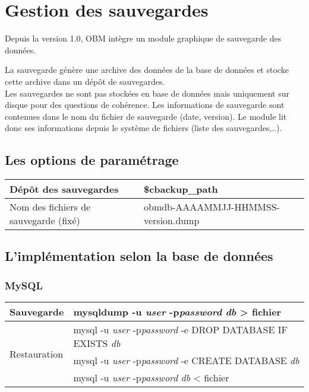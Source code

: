 
\section{Gestion des sauvegardes}

Depuis la version 1.0, OBM intègre un module graphique de sauvegarde des données.

La sauvegarde génère une archive des données de la base de données et stocke cette archive dans un dépôt de sauvegardes.\\

Les sauvegardes ne sont pas stockées en base de données mais uniquement sur disque pour des questions de cohérence.
Les informations de sauvegarde sont contenues dans le nom du fichier de sauvegarde (date, version).
Le module \backup lit donc ses informations depuis le système de fichiers (liste des sauvegardes,..).


\subsection{Les options de paramétrage}

\begin{tabular}{|p{6cm}|p{8cm}|}
\hline
Dépôt des sauvegardes & \$cbackup\_path \\
\hline
Nom des fichiers de sauvegarde (fixé) & obmdb-AAAAMMJJ-HHMMSS-version.dump \\
\hline
\end{tabular}


\subsection{L'implémentation selon la base de données}

\subsubsection{MySQL}

\begin{tabular}{|p{4cm}|p{10cm}|}
\hline
Sauvegarde & mysqldump -u \textit{user} -p\textit{password} \textit{db} > fichier\\
\hline
\multirow{3}{2cm}{Restauration} & mysql -u \textit{user} -p\textit{password} -e DROP DATABASE IF EXISTS \textit{db} \\ 
\cline{2-2}
& mysql -u \textit{user} -p\textit{password} -e CREATE DATABASE \textit{db} \\
\cline{2-2}
& mysql -u \textit{user} -p\textit{password} \textit{db} < fichier\\
\hline
\end{tabular}


